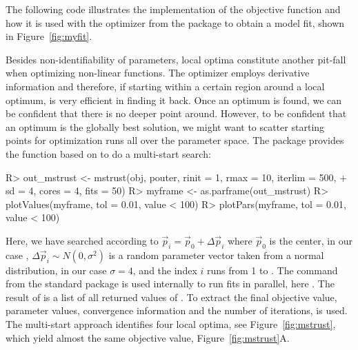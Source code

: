 \documentclass[article]{jss}
\begin{document}
The following code illustrates the implementation of the objective function and how it is used with the  optimizer from the  package \citep{trust} to obtain a model fit, shown in Figure~\ref{fig:myfit}.
%
\begin{CodeChunk}
\end{CodeChunk}
%
Besides non-identifiability of parameters, local optima constitute another pit-fall when optimizing non-linear functions. The  optimizer employs derivative information and therefore, if starting within a certain region around a local optimum, is very efficient in finding it back. Once an optimum is found, we can be confident that there is no deeper point around. However, to be confident that an optimum is the globally best solution, we might want to scatter starting points for optimization runs all over the parameter space. The  package provides the  function based on  to do a multi-start search:
%
\begin{CodeChunk}
\begin{CodeInput}
R> out_mstrust <- mstrust(obj, pouter, rinit = 1, rmax = 10, iterlim = 500,
+    sd = 4, cores = 4, fits = 50)
R> myframe <- as.parframe(out_mstrust)
R> plotValues(myframe, tol = 0.01, value < 100)
R> plotPars(myframe, tol = 0.01, value < 100)
\end{CodeInput}
\end{CodeChunk}
Here, we have searched according to $\vec p_i = \vec p_0 + \Delta\vec p_i$ where $\vec p_0$ is the center, in our case , $\Delta\vec p_i\sim N(0, \sigma^2)$ is a random parameter vector taken from a normal distribution, in our case $\sigma = 4$, and the index $i$ runs from 1 to . The  command from the standard  package \citep{parallel} is used internally to run fits in parallel, here . The result of  is a list of all returned values of . To extract the final objective value, parameter values, convergence information and the number of iterations,  is used. The multi-start approach identifies four local optima, see Figure~\ref{fig:mstrust}, which yield almost the same objective value, Figure~\ref{fig:mstrust}A.
\end{document}
